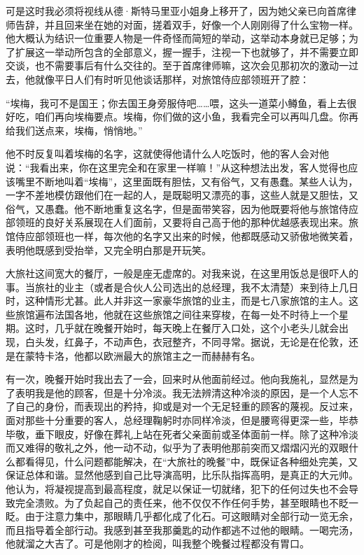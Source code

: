 \par 可是这时我必须将视线从德·斯特马里亚小姐身上移开了，因为她父亲已向首席律师告辞，并且回来坐在她的对面，搓着双手，好像一个人刚刚得了什么宝物一样。他大概认为结识一位重要人物是一件奇怪而简短的举动，这举动本身就已足够；为了扩展这一举动所包含的全部意义，握一握手，注视一下也就够了，并不需要立即交谈，也不需要事后有什么交往的。至于首席律师嘛，这次会见那初次的激动一过去，他就像平日人们有时听见他谈话那样，对旅馆侍应部领班开了腔：
\par “埃梅，我可不是国王；你去国王身旁服侍吧……喂，这头一道菜小鳟鱼，看上去很好吃，咱们再向埃梅要点。埃梅，你们做的这小鱼，我看完全可以再叫几盘。你再给我们送点来，埃梅，悄悄地。”
\par 他不时反复叫着埃梅的名字，这就使得他请什么人吃饭时，他的客人会对他说：“我看出来，你在这里完全和在家里一样嘛！”从这种想法出发，客人觉得也应该嘴里不断地叫着“埃梅”，这里面既有胆怯，又有俗气，又有愚蠢。某些人认为，一字不差地模仿跟他们在一起的人，是既聪明又漂亮的事，这些人就是又胆怯，又俗气，又愚蠢。他不断地重复这名字，但是面带笑容，因为他既要将他与旅馆侍应部领班的良好关系展现在人们面前，又要将自己高于他的那种优越感表现出来。旅馆侍应部领班也一样，每次他的名字又出来的时候，他都既感动又骄傲地微笑着，表明他既感到受抬举，又完全明白那是开玩笑。
\par 大旅社这间宽大的餐厅，一般是座无虚席的。对我来说，在这里用饭总是很吓人的事。当旅社的业主（或者是合伙人公司选出的总经理，我不太清楚）来到待上几日时，这种情形尤甚。此人并非这一家豪华旅馆的业主，而是七八家旅馆的主人。这些旅馆遍布法国各地，他就在这些旅馆之间往来穿梭，在每一处不时待上一个星期。这时，几乎就在晚餐开始时，每天晚上在餐厅入口处，这个小老头儿就会出现，白头发，红鼻子，不动声色，衣冠整齐，不同寻常。据说，无论是在伦敦，还是在蒙特卡洛，他都以欧洲最大的旅馆主之一而赫赫有名。
\par 有一次，晚餐开始时我出去了一会，回来时从他面前经过。他向我施礼，显然是为了表明我是他的顾客，但是十分冷淡。我无法辨清这种冷淡的原因，是一个人忘不了自己的身份，而表现出的矜持，抑或是对一个无足轻重的顾客的蔑视。反过来，面对那些十分重要的客人，总经理鞠躬时亦同样冷淡，但是腰弯得更深一些，毕恭毕敬，垂下眼皮，好像在葬礼上站在死者父亲面前或圣体面前一样。除了这种冷淡而又难得的敬礼之外，他一动不动，似乎为了表明他那前突而又熠熠闪光的双眼什么都看得见，什么问题都能解决，在“大旅社的晚餐”中，既保证各种细处完美，又保证总体和谐。显然他感到自己比导演高明，比乐队指挥高明，是真正的大元帅。他认为，将凝视提高到最高程度，就足以保证一切就绪，犯下的任何过失也不会导致完全溃败。为了负起自己的责任来，他不仅仅不作任何手势，甚至眼睛也不眨一眨。由于注意力集中，那眼睛几乎都化成了化石。可这眼睛对全部行动一览无余，而且指导着全部行动。我感到甚至我那羹匙的动作都逃不过他的眼睛。一喝完汤，他就溜之大吉了。可是他刚才的检阅，叫我整个晚餐过程都没有胃口。
